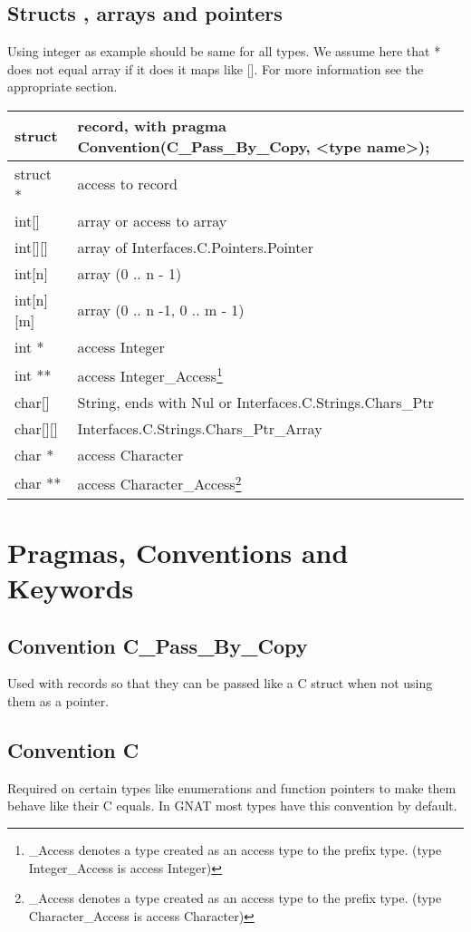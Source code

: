 \subsection{Structs , arrays and pointers}
Using integer as example should be same for all types. We assume here that * does not equal array if it does it maps like []. For more information see the appropriate section.\\
\begin{tabular}{| l | p{10cm} |}
\hline
struct	& record, with pragma Convention(C_Pass_By_Copy, <type name>); \\ \hline
struct  * &	access to record \\ \hline
int[]	& array or access to array \\ \hline
int[][]	& array of Interfaces.C.Pointers.Pointer \\ \hline
int[n]	& array (0 .. n - 1) \\ \hline
int[n][m] &	array (0 .. n -1, 0 .. m - 1) \\ \hline
int *	& access Integer \\ \hline
int **	& access Integer_Access\footnote{_Access denotes a type created as an access type to the prefix type. (type Integer_Access is access Integer)} \\ \hline
char[]	& String, ends with Nul or Interfaces.C.Strings.Chars_Ptr \\ \hline
char[][] &	Interfaces.C.Strings.Chars_Ptr_Array \\ \hline
char *	& access Character \\ \hline
char ** &	access Character_Access\footnote{_Access denotes a type created as an access type to the prefix type. (type Character_Access is access Character)} \\ \hline
\end{tabular}
\section{Pragmas, Conventions and Keywords}
\subsection{Convention C_Pass_By_Copy}
Used with records so that they can be passed like a C struct when not using them as a pointer.
\subsection{Convention C}
Required on certain types like enumerations and function pointers to make them behave like their C equals. In GNAT most types have this convention by default.
